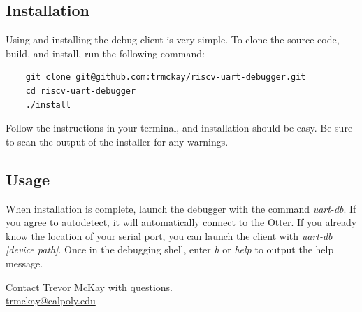 \documentclass[10pt,a4paper]{article}
\begin{document}
\subsection{Installation}
Using and installing the debug client is very simple. To clone the source code, build, and install,
run the following command:

\begin{verbatim}
    git clone git@github.com:trmckay/riscv-uart-debugger.git
    cd riscv-uart-debugger
    ./install
\end{verbatim}

Follow the instructions in your terminal, and installation should be easy. Be sure to scan the
output of the installer for any warnings.

\subsection{Usage}
When installation is complete, launch the debugger with the command \emph{uart-db}. If you agree to
autodetect, it will automatically connect to the Otter. If you already know the location of your
serial port, you can launch the client with \emph{uart-db [device path]}. Once in the debugging shell,
enter \emph{h} or \emph{help} to output the help message.

\vspace*{\fill}
\begin{center}
    \noindent Contact Trevor McKay with questions.\\
    \href{mailto:trmckay@calpoly.edu}{trmckay@calpoly.edu}
\end{center}
\end{document}
